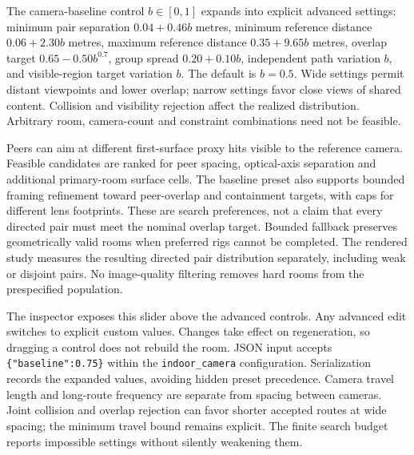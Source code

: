 \documentclass{article}
\begin{document}
The camera-baseline control $b\in[0,1]$ expands into explicit advanced settings: minimum pair separation $0.04+0.46b$ metres, minimum reference distance $0.06+2.30b$ metres, maximum reference distance $0.35+9.65b$ metres, overlap target $0.65-0.50b^{0.7}$, group spread $0.20+0.10b$, independent path variation $b$, and visible-region target variation $b$. The default is $b=0.5$. Wide settings permit distant viewpoints and lower overlap; narrow settings favor close views of shared content. Collision and visibility rejection affect the realized distribution. Arbitrary room, camera-count and constraint combinations need not be feasible.

Peers can aim at different first-surface proxy hits visible to the reference camera. Feasible candidates are ranked for peer spacing, optical-axis separation and additional primary-room surface cells. The baseline preset also supports bounded framing refinement toward peer-overlap and containment targets, with caps for different lens footprints. These are search preferences, not a claim that every directed pair must meet the nominal overlap target. Bounded fallback preserves geometrically valid rooms when preferred rigs cannot be completed. The rendered study measures the resulting directed pair distribution separately, including weak or disjoint pairs. No image-quality filtering removes hard rooms from the prespecified population.

The inspector exposes this slider above the advanced controls. Any advanced edit switches to explicit custom values. Changes take effect on regeneration, so dragging a control does not rebuild the room. JSON input accepts \texttt{\{"baseline":0.75\}} within the \texttt{indoor\_camera} configuration. Serialization records the expanded values, avoiding hidden preset precedence. Camera travel length and long-route frequency are separate from spacing between cameras. Joint collision and overlap rejection can favor shorter accepted routes at wide spacing; the minimum travel bound remains explicit. The finite search budget reports impossible settings without silently weakening them.
\end{document}
